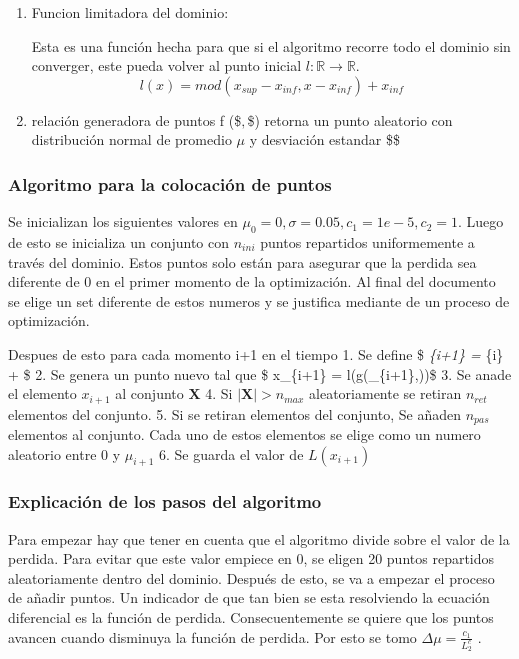 \documentclass[11pt]{article}
\begin{document}
\begin{enumerate}
\def\labelenumi{\arabic{enumi}.}
\item
  Funcion limitadora del dominio:

  Esta es una función hecha para que si el algoritmo recorre todo el
  dominio sin converger, este pueda volver al punto inicial
  \(l : \mathbb{R}\rightarrow \mathbb{R}.\)
  \[ l(x) = mod(x_{sup}-x_{inf},x-x_{inf})+x_{inf} \]
\item
  relación generadora de puntos f (\$\mu \(,\)\sigma\$) retorna un punto
  aleatorio con distribución normal de promedio \(\mu\) y desviación
  estandar \$\sigma \$
\end{enumerate}

\hypertarget{algoritmo-para-la-colocaciuxf3n-de-puntos}{%
\subsubsection{Algoritmo para la colocación de
puntos}\label{algoritmo-para-la-colocaciuxf3n-de-puntos}}

Se inicializan los siguientes valores en
\(\mu _0 = 0, \sigma = 0.05, c_1 = 1e-5, c_2 = 1\). Luego de esto se
inicializa un conjunto con \(n_{ini}\) puntos repartidos uniformemente a
través del dominio. Estos puntos solo están para asegurar que la perdida
sea diferente de 0 en el primer momento de la optimización. Al final del
documento se elige un set diferente de estos numeros y se justifica
mediante de un proceso de optimización.

Despues de esto para cada momento i+1 en el tiempo 1. Se define \$
\mu\emph{\{i+1\} = \mu}\{i\} +  \$ 2. Se genera un
punto nuevo tal que \$ x\_\{i+1\} = l(g(\mu\_\{i+1\},\sigma))\$ 3. Se
anade el elemento \(x_{i+1}\) al conjunto \(\mathbf{X}\) 4. Si
\(|\mathbf{X}|>n_{max}\) aleatoriamente se retiran \(n_{ret}\) elementos
del conjunto. 5. Si se retiran elementos del conjunto, Se añaden
\(n_{pas}\) elementos al conjunto. Cada uno de estos elementos se elige
como un numero aleatorio entre 0 y \(\mu_{i+1}\) 6. Se guarda el valor
de \(L(x_{i+1})\)

\hypertarget{explicaciuxf3n-de-los-pasos-del-algoritmo}{%
\subsubsection{Explicación de los pasos del
algoritmo}\label{explicaciuxf3n-de-los-pasos-del-algoritmo}}

Para empezar hay que tener en cuenta que el algoritmo divide sobre el
valor de la perdida. Para evitar que este valor empiece en 0, se eligen
20 puntos repartidos aleatoriamente dentro del dominio. Después de esto,
se va a empezar el proceso de añadir puntos. Un indicador de que tan
bien se esta resolviendo la ecuación diferencial es la función de
perdida. Consecuentemente se quiere que los puntos avancen cuando
disminuya la función de perdida. Por esto se tomo
\(\Delta \mu = \frac{c_1}{L^c_2}\) .
\end{document}
